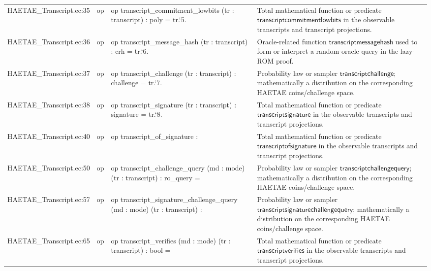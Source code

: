 \documentclass[10pt]{article}
\begin{document}
\begin{longtable}{L{0.11\textwidth}L{0.055\textwidth}L{0.385\textwidth}L{0.41\textwidth}}
HAETAE\_\allowbreak{}Transcript.\allowbreak{}ec:\allowbreak{}35 & op & {\ttfamily\scriptsize op transcript\_\allowbreak{}commitment\_\allowbreak{}lowbits (tr : transcript) : poly = tr.`5.} & Total mathematical function or predicate $\mathsf{transcriptcommitmentlowbits}$ in the observable transcripts and transcript projections. \\
HAETAE\_\allowbreak{}Transcript.\allowbreak{}ec:\allowbreak{}36 & op & {\ttfamily\scriptsize op transcript\_\allowbreak{}message\_\allowbreak{}hash (tr : transcript) : crh = tr.`6.} & Oracle-related function $\mathsf{transcriptmessagehash}$ used to form or interpret a random-oracle query in the lazy-ROM proof. \\
HAETAE\_\allowbreak{}Transcript.\allowbreak{}ec:\allowbreak{}37 & op & {\ttfamily\scriptsize op transcript\_\allowbreak{}challenge (tr : transcript) : challenge = tr.`7.} & Probability law or sampler $\mathsf{transcriptchallenge}$; mathematically a distribution on the corresponding HAETAE coins/challenge space. \\
HAETAE\_\allowbreak{}Transcript.\allowbreak{}ec:\allowbreak{}38 & op & {\ttfamily\scriptsize op transcript\_\allowbreak{}signature (tr : transcript) : signature = tr.`8.} & Total mathematical function or predicate $\mathsf{transcriptsignature}$ in the observable transcripts and transcript projections. \\
HAETAE\_\allowbreak{}Transcript.\allowbreak{}ec:\allowbreak{}40 & op & {\ttfamily\scriptsize op transcript\_\allowbreak{}of\_\allowbreak{}signature :} & Total mathematical function or predicate $\mathsf{transcriptofsignature}$ in the observable transcripts and transcript projections. \\
HAETAE\_\allowbreak{}Transcript.\allowbreak{}ec:\allowbreak{}50 & op & {\ttfamily\scriptsize op transcript\_\allowbreak{}challenge\_\allowbreak{}query (md : mode) (tr : transcript) : ro\_\allowbreak{}query =} & Probability law or sampler $\mathsf{transcriptchallengequery}$; mathematically a distribution on the corresponding HAETAE coins/challenge space. \\
HAETAE\_\allowbreak{}Transcript.\allowbreak{}ec:\allowbreak{}57 & op & {\ttfamily\scriptsize op transcript\_\allowbreak{}signature\_\allowbreak{}challenge\_\allowbreak{}query (md : mode) (tr : transcript) :} & Probability law or sampler $\mathsf{transcriptsignaturechallengequery}$; mathematically a distribution on the corresponding HAETAE coins/challenge space. \\
HAETAE\_\allowbreak{}Transcript.\allowbreak{}ec:\allowbreak{}65 & op & {\ttfamily\scriptsize op transcript\_\allowbreak{}verifies (md : mode) (tr : transcript) : bool =} & Total mathematical function or predicate $\mathsf{transcriptverifies}$ in the observable transcripts and transcript projections. \\

\end{longtable}
\end{document}

